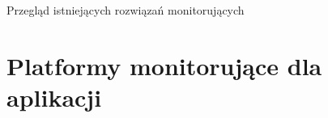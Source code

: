 \begin{chapter}{Przegląd istniejących rozwiązań monitorujących}
	\newcommand{\chapterPath}{chapters/Existing_solutions}

	

	\section{Platformy monitorujące dla aplikacji} 
	
	
	
	
	
	
	
\end{chapter}
